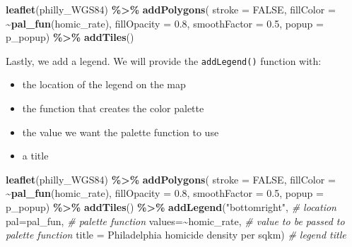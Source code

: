 \documentclass[
]{book}
\newenvironment{Shaded}{\begin{snugshade}}{\end{snugshade}}
\newcommand{\AttributeTok}[1]{\textcolor[rgb]{0.13,0.29,0.53}{#1}}
\newcommand{\CommentTok}[1]{\textcolor[rgb]{0.56,0.35,0.01}{\textit{#1}}}
\newcommand{\ConstantTok}[1]{\textcolor[rgb]{0.56,0.35,0.01}{#1}}
\newcommand{\FloatTok}[1]{\textcolor[rgb]{0.00,0.00,0.81}{#1}}
\newcommand{\FunctionTok}[1]{\textcolor[rgb]{0.13,0.29,0.53}{\textbf{#1}}}
\newcommand{\NormalTok}[1]{#1}
\newcommand{\SpecialCharTok}[1]{\textcolor[rgb]{0.81,0.36,0.00}{\textbf{#1}}}
\newcommand{\StringTok}[1]{\textcolor[rgb]{0.31,0.60,0.02}{#1}}
\providecommand{\tightlist}{%
  \setlength{\itemsep}{0pt}\setlength{\parskip}{0pt}}
\begin{document}
\begin{Shaded}
\begin{Highlighting}[]
\FunctionTok{leaflet}\NormalTok{(philly\_WGS84) }\SpecialCharTok{\%\textgreater{}\%}
  \FunctionTok{addPolygons}\NormalTok{(}
    \AttributeTok{stroke =} \ConstantTok{FALSE}\NormalTok{, }
    \AttributeTok{fillColor =} \SpecialCharTok{\textasciitilde{}}\FunctionTok{pal\_fun}\NormalTok{(homic\_rate),}
    \AttributeTok{fillOpacity =} \FloatTok{0.8}\NormalTok{, }\AttributeTok{smoothFactor =} \FloatTok{0.5}\NormalTok{,}
    \AttributeTok{popup =}\NormalTok{ p\_popup) }\SpecialCharTok{\%\textgreater{}\%}
  \FunctionTok{addTiles}\NormalTok{()}
\end{Highlighting}
\end{Shaded}

Lastly, we add a legend. We will provide the \texttt{addLegend()} function with:

\begin{itemize}
\tightlist
\item
  the location of the legend on the map\\
\item
  the function that creates the color palette\\
\item
  the value we want the palette function to use\\
\item
  a title
\end{itemize}

\begin{Shaded}
\begin{Highlighting}[]
\FunctionTok{leaflet}\NormalTok{(philly\_WGS84) }\SpecialCharTok{\%\textgreater{}\%}
  \FunctionTok{addPolygons}\NormalTok{(}
    \AttributeTok{stroke =} \ConstantTok{FALSE}\NormalTok{, }
    \AttributeTok{fillColor =} \SpecialCharTok{\textasciitilde{}}\FunctionTok{pal\_fun}\NormalTok{(homic\_rate),}
    \AttributeTok{fillOpacity =} \FloatTok{0.8}\NormalTok{, }\AttributeTok{smoothFactor =} \FloatTok{0.5}\NormalTok{,}
    \AttributeTok{popup =}\NormalTok{ p\_popup) }\SpecialCharTok{\%\textgreater{}\%}
  \FunctionTok{addTiles}\NormalTok{() }\SpecialCharTok{\%\textgreater{}\%}
  \FunctionTok{addLegend}\NormalTok{(}\StringTok{"bottomright"}\NormalTok{,  }\CommentTok{\# location}
            \AttributeTok{pal=}\NormalTok{pal\_fun,    }\CommentTok{\# palette function}
            \AttributeTok{values=}\SpecialCharTok{\textasciitilde{}}\NormalTok{homic\_rate,  }\CommentTok{\# value to be passed to palette function}
            \AttributeTok{title =} \StringTok{\textquotesingle{}Philadelphia homicide density per sqkm\textquotesingle{}}\NormalTok{) }\CommentTok{\# legend title}
\end{Highlighting}
\end{Shaded}
\end{document}
